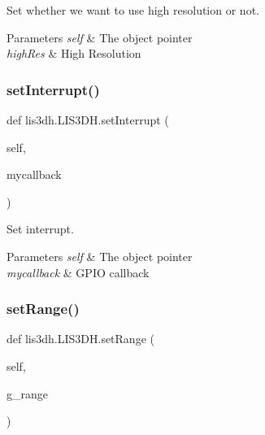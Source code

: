 Set whether we want to use high resolution or not. 


\begin{DoxyParams}{Parameters}
{\em self} & The object pointer \\
\hline
{\em high\+Res} & High Resolution \\
\hline
\end{DoxyParams}
\mbox{\label{classlis3dh_1_1_l_i_s3_d_h_ab70d7a59ae03af9d4291d856957e065e}} 
\subsubsection{\texorpdfstring{set\+Interrupt()}{setInterrupt()}}
{\footnotesize\ttfamily def lis3dh.\+L\+I\+S3\+D\+H.\+set\+Interrupt (\begin{DoxyParamCaption}\item[{}]{self,  }\item[{}]{mycallback }\end{DoxyParamCaption})}



Set interrupt. 


\begin{DoxyParams}{Parameters}
{\em self} & The object pointer \\
\hline
{\em mycallback} & G\+P\+IO callback \\
\hline
\end{DoxyParams}
\mbox{\label{classlis3dh_1_1_l_i_s3_d_h_ac12f8623e3535c7fa437e519ee1eb635}} 
\subsubsection{\texorpdfstring{set\+Range()}{setRange()}}
{\footnotesize\ttfamily def lis3dh.\+L\+I\+S3\+D\+H.\+set\+Range (\begin{DoxyParamCaption}\item[{}]{self,  }\item[{}]{g\+\_\+range }\end{DoxyParamCaption})}



